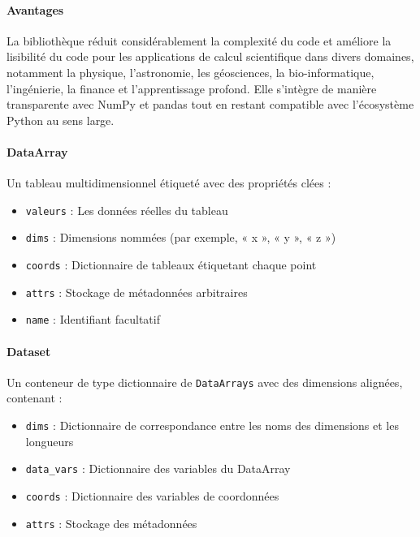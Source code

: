 \documentclass[11pt]{article}
\begin{document}
\hypertarget{avantages}{%
\paragraph{Avantages}\label{avantages}}

La bibliothèque réduit considérablement la complexité du code et
améliore la lisibilité du code pour les applications de calcul
scientifique dans divers domaines, notamment la physique, l'astronomie,
les géosciences, la bio-informatique, l'ingénierie, la finance et
l'apprentissage profond. Elle s'intègre de manière transparente avec
NumPy et pandas tout en restant compatible avec l'écosystème Python au
sens large.

\hypertarget{dataarray}{%
\paragraph{DataArray}\label{dataarray}}

Un tableau multidimensionnel étiqueté avec des propriétés clées :

\begin{itemize}
\item
  \texttt{valeurs} : Les données réelles du tableau
\item
  \texttt{dims} : Dimensions nommées (par exemple, « x », « y », « z »)
\item
  \texttt{coords} : Dictionnaire de tableaux étiquetant chaque point
\item
  \texttt{attrs} : Stockage de métadonnées arbitraires
\item
  \texttt{name} : Identifiant facultatif
\end{itemize}

\hypertarget{dataset}{%
\paragraph{Dataset}\label{dataset}}

Un conteneur de type dictionnaire de \texttt{DataArrays} avec des
dimensions alignées, contenant :

\begin{itemize}
\item
  \texttt{dims} : Dictionnaire de correspondance entre les noms des
  dimensions et les longueurs
\item
  \texttt{data\_vars} : Dictionnaire des variables du DataArray
\item
  \texttt{coords} : Dictionnaire des variables de coordonnées
\item
  \texttt{attrs} : Stockage des métadonnées
\end{itemize}
\end{document}
